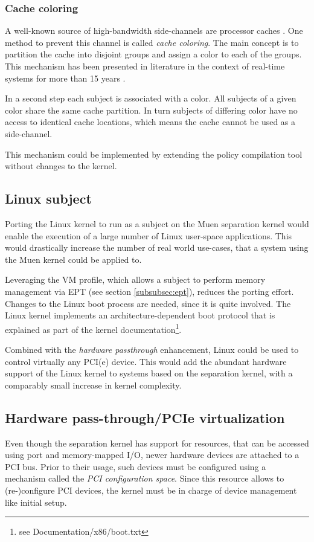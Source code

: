 \subsubsection{Cache coloring}
A well-known source of high-bandwidth side-channels are processor caches
\cite{cryptoeprint:2005:271}. One method to prevent this channel is called
\emph{cache coloring}. The main concept is to partition the cache into disjoint
groups and assign a color to each of the groups. This mechanism has been
presented in literature in the context of real-time systems for more than 15
years \cite{Mueller:1995:CSS:216633.216677}
\cite{Liedtke:1997:OCP:523983.828369}.

In a second step each subject is associated with a color. All subjects of a
given color share the same cache partition. In turn subjects of differing color
have no access to identical cache locations, which means the cache cannot be
used as a side-channel.

This mechanism could be implemented by extending the policy compilation tool
without changes to the kernel.

\subsection{Linux subject}
Porting the Linux kernel to run as a subject on the Muen separation kernel would
enable the execution of a large number of Linux user-space applications. This
would drastically increase the number of real world use-cases, that a system
using the Muen kernel could be applied to.

Leveraging the VM profile, which allows a subject to perform memory management
via EPT (see section \ref{subsubsec:ept}), reduces the porting effort. Changes
to the Linux boot process are needed, since it is quite involved. The Linux
kernel implements an architecture-dependent boot protocol that is explained as
part of the kernel documentation\footnote{see Documentation/x86/boot.txt}.

Combined with the \emph{hardware passthrough} enhancement, Linux could be used
to control virtually any PCI(e) device. This would add the abundant hardware
support of the Linux kernel to systems based on the separation kernel, with a
comparably small increase in kernel complexity.

\subsection{Hardware pass-through/PCIe virtualization}
Even though the separation kernel has support for resources, that can be
accessed using port and memory-mapped I/O, newer hardware devices are attached
to a PCI bus. Prior to their usage, such devices must be configured using a
mechanism called the \emph{PCI configuration space}. Since this resource allows
to (re-)configure PCI devices, the kernel must be in charge of device
management like initial setup.

